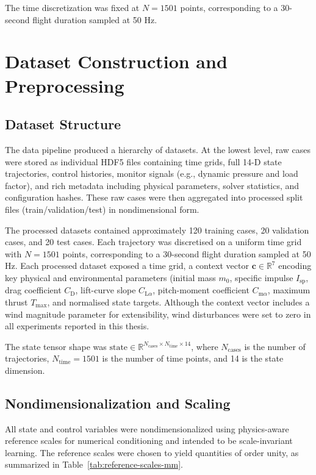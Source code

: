 The time discretization was fixed at \(N = 1501\) points, corresponding to a
30-second flight duration sampled at 50 Hz.

\section{Dataset Construction and Preprocessing}

\subsection{Dataset Structure}

The data pipeline produced a hierarchy of datasets. At the lowest level, raw cases
were stored as individual HDF5 files containing time grids, full 14-D state
trajectories, control histories, monitor signals (e.g., dynamic pressure and load
factor), and rich metadata including physical parameters, solver statistics, and
configuration hashes. These raw cases were then aggregated into processed split
files (train/validation/test) in nondimensional form. 

The processed datasets contained approximately 120 training cases, 20 validation
cases, and 20 test cases. Each trajectory was discretised on a uniform time
grid with \(N = 1501\) points, corresponding to a 30-second flight duration
sampled at 50 Hz. Each processed dataset exposed a time grid, a context vector
\(\mathbf{c} \in \mathbb{R}^7\) encoding key physical and environmental
parameters (initial mass \(m_0\), specific impulse \(I_\mathrm{sp}\), drag
coefficient \(C_\mathrm{D}\), lift-curve slope \(C_{\mathrm{L}\alpha}\),
pitch-moment coefficient \(C_{\mathrm{m}\alpha}\), maximum thrust
\(T_\mathrm{max}\), and normalised state targets. Although the context vector 
includes a wind magnitude parameter for extensibility, wind disturbances were 
set to zero in all experiments reported in this thesis.

The state tensor shape was \(\text{state} \in \mathbb{R}^{N_\mathrm{cases}
\times N_\mathrm{time} \times 14}\), where \(N_\mathrm{cases}\) is the number
of trajectories, \(N_\mathrm{time} = 1501\) is the number of time points, and
14 is the state dimension.

\subsection{Nondimensionalization and Scaling}

All state and control variables were nondimensionalized using physics-aware
reference scales for numerical conditioning and intended to be scale-invariant
learning. The reference scales were chosen to yield quantities of order unity,
as summarized in Table~\ref{tab:reference-scales-mm}.

